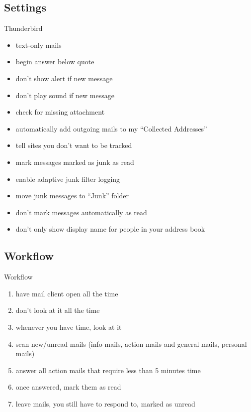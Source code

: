 \documentclass{beamer}
\begin{document}
	\subsection{Settings}
	\begin{frame}{Thunderbird}
		\begin{itemize}
			\item text-only mails
			\item begin answer below quote
			\item don't show alert if new message
			\item don't play sound if new message
			\item check for missing attachment
			\item automatically add outgoing mails to my ``Collected Addresses''
			\item tell sites you don't want to be tracked
			\item mark messages marked as junk as read
			\item enable adaptive junk filter logging
			\item move junk messages to ``Junk'' folder
			\item don't mark messages automatically as read
			\item don't only show display name for people in your address book
		\end{itemize}
	\end{frame}
	
	\subsection{Workflow}		
	\begin{frame}{Workflow}
		\begin{enumerate}
			\item have mail client open all the time
			\item don't look at it all the time
			\item whenever you have time, look at it
			\item scan new/unread mails (info mails, action mails and general mails, personal mails)
			\item answer all action mails that require less than 5 minutes time
			\item once answered, mark them as read
			\item leave mails, you still have to respond to, marked as unread
		\end{enumerate}
	\end{frame}	
	
\end{document}
